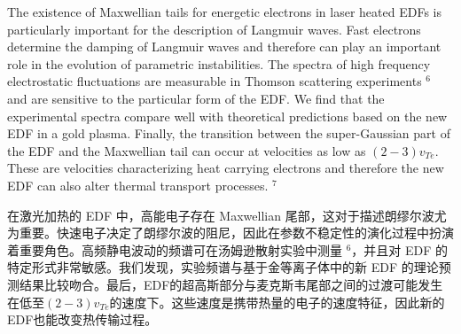 \documentclass[oneside,onecolumn]{article}
\newcommand\enzhbox[2]{
  	\quad\par \begin{paracol}{2} \colseprulecolor{black} 
  			\begin{spacing}{1.0}
  				\footnotesize  #1
  			\end{spacing}
  		\switchcolumn[1] 
  		#2
  	\end{paracol} 
  }
\begin{document}
\begin{sloppypar}
 
\enzhbox{   The existence of Maxwellian tails for energetic electrons in laser heated EDFs is particularly important for the description of Langmuir waves. Fast electrons determine the damping of Langmuir waves and therefore can play an important role in the evolution of parametric instabilities. The spectra of high frequency electrostatic fluctuations are measurable in Thomson scattering experiments ${ }^{6}$ and are sensitive to the particular form of the EDF. We find that the experimental spectra compare well with theoretical predictions based on the new EDF in a gold plasma. Finally, the transition between the super-Gaussian part of the EDF and the Maxwellian tail can occur at velocities as low as $(2-3) v_{T e}$. These are velocities characterizing heat carrying electrons and therefore the new EDF can also alter thermal transport processes. ${ }^{7}$
}{
在激光加热的 EDF 中，高能电子存在 Maxwellian 尾部，这对于描述朗缪尔波尤为重要。快速电子决定了朗缪尔波的阻尼，因此在参数不稳定性的演化过程中扮演着重要角色。高频静电波动的频谱可在汤姆逊散射实验中测量 ${ }^{6}$，并且对 EDF 的特定形式非常敏感。我们发现，实验频谱与基于金等离子体中的新 EDF 的理论预测结果比较吻合。最后，EDF的超高斯部分与麦克斯韦尾部之间的过渡可能发生在低至$(2-3) v_{T e}$的速度下。这些速度是携带热量的电子的速度特征，因此新的EDF也能改变热传输过程。

}
  

\end{sloppypar}
\end{document}

